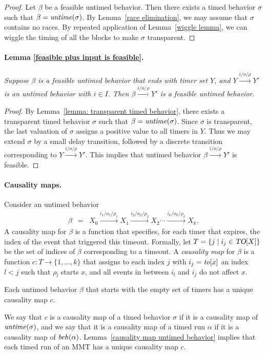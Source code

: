 \begin{proof}
Let $\beta$ be a feasible untimed behavior.
Then there exists a timed behavior $\sigma$ such that $\beta = \mathit{untime}(\sigma)$.
By Lemma~\ref{race elimination}, we may assume that $\sigma$ contains no races.
By repeated application of Lemma~\ref{wiggle lemma}, we can wiggle the timing of all the blocks to make $\sigma$ transparent.
\end{proof}

\paragraph{Lemma \ref{feasible plus input is feasible}.}
\emph{Suppose $\beta$ is a feasible untimed behavior that ends with timer set $Y$, and 
$Y \xrightarrow{i/o/\rho} Y'$ is an untimed behavior with $i \in I$.
Then $\beta \xrightarrow{i/o/\rho} Y'$ is a feasible untimed behavior.}

\begin{proof}
By Lemma~\ref{lemma: transparent timed behavior}, there exists a transparent timed behavior
$\sigma$ such that $\beta = \mathit{untime}(\sigma)$. Since $\sigma$ is transparent, the last valuation of $\sigma$ assigns a positive value to
all timers in $Y$. Thus we may extend $\sigma$ by a small delay transition, followed by a discrete transition corresponding to
$Y \xrightarrow{i/o/\rho} Y'$. This implies that untimed behavior $\beta \xrightarrow{i/o/\rho} Y'$ is feasible.
\end{proof}

\paragraph{Causality maps.} 
Consider an untimed behavior
\begin{eqnarray*}
\beta & = & X_0 \xrightarrow{i_1/o_1/\rho_1} X_1  \xrightarrow{i_2/o_2/\rho_2} X_2 \cdots \xrightarrow{i_k/o_k/\rho_k} X_{k}.
\end{eqnarray*}
A causality map for $\beta$ is a function that specifies, for each timer that expires, the index of the event that
triggered this timeout.
Formally, let $T = \{ j \mid i_j \in \mbox{\sl TO}[X] \}$ be the set of indices of $\beta$ corresponding to a timeout.
A \emph{causality map} for $\beta$ is a function $c: T \rightarrow \{ 1 ,\ldots, k \}$ that assigns
to each index $j$ with $i_j = \mathit{to}[x]$ an index $l < j$ such that $\rho_l$ starts $x$, and all events in between $i_l$ and $i_j$
do not affect $x$.

\begin{lemma}
\label{causality map untimed behavior}
Each untimed behavior $\beta$ that starts with the empty set of timers has a unique causality map $c$.
\end{lemma}
We say that $c$ is a causality map of a timed behavior $\sigma$ if it is a causality map of $\mathit{untime}(\sigma)$,
and we say that it is a causality map of a timed run $\alpha$ if it is a causality map of $\mathit{beh}(\alpha)$.
Lemma~\ref{causality map untimed behavior} implies that each timed run of an MMT has a unique causality map $c$.


